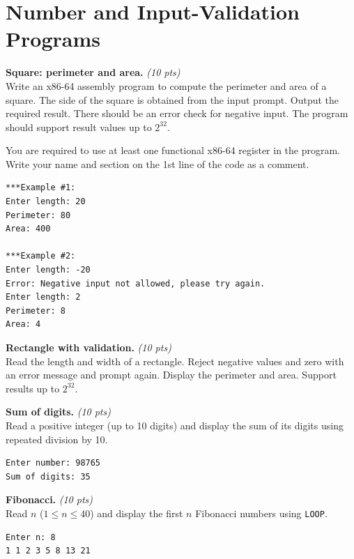 \documentclass[11pt,letterpaper]{article}
\newcommand{\pts}[1]{\hfill\textit{(#1 pts)}}
\newcommand{\ttl}[1]{\textbf{#1.}}
\begin{document}
\section{Number and Input-Validation Programs}

\begin{problems}

\item \ttl{Square: perimeter and area} \pts{10}
\\Write an x86-64 assembly program to compute the perimeter and area of a square. The side of the square is obtained from the input prompt. Output the required result. There should be an error check for negative input. The program should support result values up to $2^{32}$.

You are required to use at least one functional x86-64 register in the program. Write your name and section on the 1st line of the code as a comment.
\begin{lstlisting}[style=out]
***Example #1:
Enter length: 20
Perimeter: 80
Area: 400

***Example #2:
Enter length: -20
Error: Negative input not allowed, please try again.
Enter length: 2
Perimeter: 8
Area: 4
\end{lstlisting}

\item \ttl{Rectangle with validation} \pts{10}
\\Read the length and width of a rectangle. Reject negative values and zero with an error message and prompt again. Display the perimeter and area. Support results up to $2^{32}$.

\item \ttl{Sum of digits} \pts{10}
\\Read a positive integer (up to 10 digits) and display the sum of its digits using repeated division by 10.
\begin{lstlisting}[style=out]
Enter number: 98765
Sum of digits: 35
\end{lstlisting}

\item \ttl{Fibonacci} \pts{10}
\\Read $n$ ($1 \le n \le 40$) and display the first $n$ Fibonacci numbers using \texttt{LOOP}.
\begin{lstlisting}[style=out]
Enter n: 8
1 1 2 3 5 8 13 21
\end{lstlisting}


\end{problems}
\end{document}
